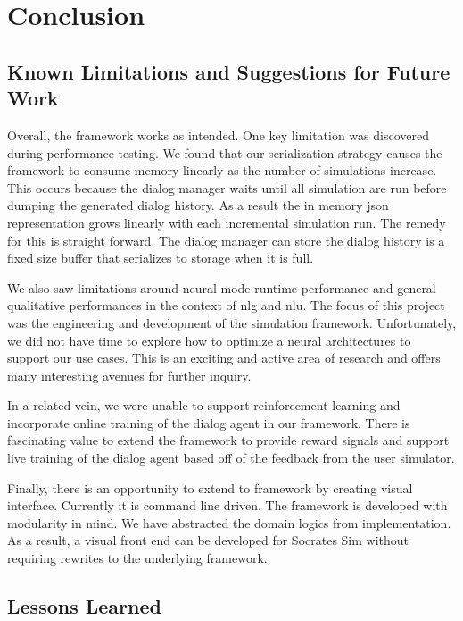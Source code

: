 \chapter{Conclusion}
\label{chap:conclusions}

\section{ Known Limitations and Suggestions for Future Work}
\label{sec:issues} 

Overall, the framework works as intended. One key limitation was discovered during performance testing. We found that our serialization strategy causes the framework to consume memory linearly as the number of simulations increase. This occurs because the dialog manager waits until all simulation are run before dumping the generated dialog history. As a result the in memory json representation grows linearly with each incremental simulation run. The remedy for this is straight forward. The dialog manager can store the dialog history is a fixed size buffer that serializes to storage when it is full. 

We also saw limitations around neural mode runtime performance and general qualitative performances in the context of nlg and nlu. The focus of this project was the engineering and development of the simulation framework. Unfortunately, we did not have time to explore how to optimize a neural architectures to support our use cases. This is an exciting and active area of research and offers many interesting avenues for further inquiry.

In a related vein, we were unable to support reinforcement learning and incorporate online training of the dialog agent in our framework. There is fascinating value to extend the framework to provide reward signals and support live training of the dialog agent based off of the feedback from the user simulator. 

Finally, there is an opportunity to extend to framework by creating visual interface. Currently it is command line driven. The framework is developed with modularity in mind. We have abstracted the domain logics from implementation. As a result, a visual front end can be developed for Socrates Sim without requiring rewrites to the underlying framework.

\section{Lessons Learned}
\label{sec:lessons}

